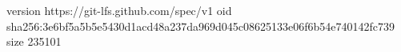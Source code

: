 version https://git-lfs.github.com/spec/v1
oid sha256:3e6bf5a5b5e5430d1acd48a237da969d045c08625133e06f6b54e740142fc739
size 235101
